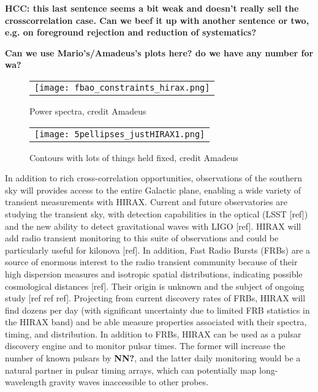 \documentclass[]{spie}  %
\begin{document}
{\bf HCC: this last sentence seems a bit weak and doesn't really sell the crosscorrelation case.  Can we beef it up with another sentence or two, e.g. on foreground rejection and reduction of systematics?}
\newline

\textbf{Can we use Mario's/Amadeus's plots here? do we have any number for wa?}

 \begin{figure} [ht]
  \begin{center}
   \begin{tabular}{c} %
   \texttt{[image: fbao\_constraints\_hirax.png]}
   \end{tabular}
   \end{center}
   \caption[Power Spectra] 
   { \label{fig:pspec} 
Power spectra, credit Amadeus }
   \end{figure} 

  \begin{figure} [ht]
  \begin{center}
   \begin{tabular}{c} %
   \texttt{[image: 5pellipses\_justHIRAX1.png]}
   \end{tabular}
   \end{center}
   \caption[Contours] 
   { \label{fig:contours} 
Contours with lots of things held fixed, credit Amadeus}
   \end{figure} 


In addition to rich cross-correlation opportunities, observations of the southern sky will provides access to the entire Galactic plane, enabling a wide variety of transient measurements with HIRAX. Current and future observatories are studying the transient sky, with detection capabilities in the optical (LSST [ref]) and the new ability to detect gravitational waves with LIGO [ref]. HIRAX will add radio transient monitoring to this suite of observations and could be particularly useful for kilonova [ref]. In addition, Fast Radio Bursts (FRBs) are a source of enormous interest to the radio transient community because of their high dispersion measures and isotropic spatial distributions, indicating possible cosmological distances [ref]. Their origin is unknown and the subject of ongoing study [ref ref ref]. Projecting from current discovery rates of FRBs, HIRAX will find dozens per day (with significant uncertainty due to limited FRB statistics in the HIRAX band) and be able measure properties associated with their spectra, timing, and distribution. In addition to FRBs, HIRAX can be used as a pulsar discovery engine and to monitor pulsar times. The former will increase the number of known pulsars by \textbf{NN?}, and the latter daily monitoring would be a natural partner in pulsar timing arrays, which can potentially map long-wavelength gravity waves inaccessible to other probes. \newline 
\end{document}
